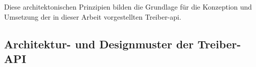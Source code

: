 Diese architektonischen Prinzipien bilden die Grundlage für die Konzeption und Umsetzung der in dieser Arbeit vorgestellten Treiber-\gls{api}.


\subsection{Architektur- und Designmuster der Treiber-API}

%
